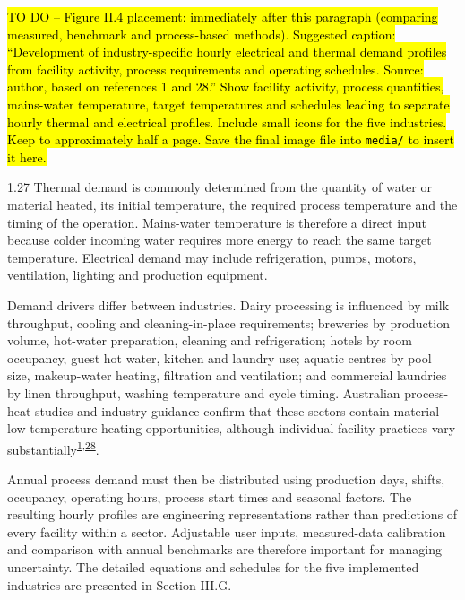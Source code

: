 \documentclass[12pt,letterpaper]{article}
\newcommand{\placeholder}[1]{\hl{#1}}
\DeclareRobustCommand{\citenum}[1]{\hyperlink{ref:#1}{#1}} %
\begin{document}
\placeholder{TO DO -- Figure II.4 placement: immediately after this paragraph (comparing measured, benchmark and process-based methods). Suggested caption: ``Development of industry-specific hourly electrical and thermal demand profiles from facility activity, process requirements and operating schedules. Source: author, based on references 1 and 28.'' Show facility activity, process quantities, mains-water temperature, target temperatures and schedules leading to separate hourly thermal and electrical profiles. Include small icons for the five industries. Keep to approximately half a page. Save the final image file into \texttt{media/} to insert it here.}

\begin{spacing}{1.27}
Thermal demand is commonly determined from the quantity of water or material heated, its initial temperature, the required process temperature and the timing of the operation. Mains-water temperature is therefore a direct input because colder incoming water requires more energy to reach the same target temperature. Electrical demand may include refrigeration, pumps, motors, ventilation, lighting and production equipment.\par

\vspace{0.15in}

Demand drivers differ between industries. Dairy processing is influenced by milk throughput, cooling and cleaning-in-place requirements; breweries by production volume, hot-water preparation, cleaning and refrigeration; hotels by room occupancy, guest hot water, kitchen and laundry use; aquatic centres by pool size, makeup-water heating, filtration and ventilation; and commercial laundries by linen throughput, washing temperature and cycle timing. Australian process-heat studies and industry guidance confirm that these sectors contain material low-temperature heating opportunities, although individual facility practices vary substantially\textsuperscript{\citenum{1},\citenum{28}}.\par

\vspace{0.15in}

Annual process demand must then be distributed using production days, shifts, occupancy, operating hours, process start times and seasonal factors. The resulting hourly profiles are engineering representations rather than predictions of every facility within a sector. Adjustable user inputs, measured-data calibration and comparison with annual benchmarks are therefore important for managing uncertainty. The detailed equations and schedules for the five implemented industries are presented in Section III.G.\par
\end{spacing}
\end{document}
